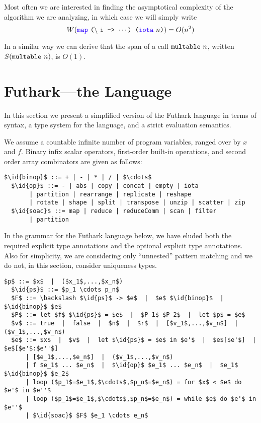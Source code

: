 \documentclass[oneside,11pt]{book}
\begin{document}
\noindent
Most often we are interested in finding the asymptotical complexity of
the algorithm we are analyzing, in which case we will simply write
$$W(\fop{map}~\kw{(}\backslash~\kw{i -> $\cdots$) (}\fop{iota}~\kw{$n$)}) = O(n^2) $$

In a similar way we can derive that the span of a call
$\texttt{multable}~n$, written $S(\texttt{multable}~n)$, is $O(1)$.


\section{Futhark---the Language}

In this section we present a simplified version of the Futhark
language in terms of syntax, a type system for the language, and a
strict evaluation semantics.

We assume a countable infinite number of program variables, ranged over
by $x$ and $f$. Binary infix scalar operators, first-order built-in operations, and
second order array combinators are given as follows:

\begin{lstlisting}[mathescape=true]
  $\id{binop}$ ::= + | - | * | / | $\cdots$
  $\id{op}$ ::= - | abs | copy | concat | empty | iota
       | partition | rearrange | replicate | reshape
       | rotate | shape | split | transpose | unzip | scatter | zip
  $\id{soac}$ ::= map | reduce | reduceComm | scan | filter
       | partition
\end{lstlisting}

In the grammar for the Futhark language below, we have eluded both the
required explicit type annotations and the optional explicit type
annotations. Also for simplicity, we are considering only ``unnested''
pattern matching and we do not, in this section, consider uniqueness types.

\begin{lstlisting}[mathescape=true]
  $p$ ::= $x$  |  ($x_1$,...,$x_n$)
  $\id{ps}$ ::= $p_1 \cdots p_n$
  $F$ ::= \backslash $\id{ps}$ -> $e$  |  $e$ $\id{binop}$  |  $\id{binop}$ $e$
  $P$ ::= let $f$ $\id{ps}$ = $e$  |  $P_1$ $P_2$  |  let $p$ = $e$
  $v$ ::= true  |  false  |  $n$  |  $r$  |  [$v_1$,...,$v_n$]  |  ($v_1$,...,$v_n$)
  $e$ ::= $x$  |  $v$  |  let $\id{ps}$ = $e$ in $e'$  |  $e$[$e'$]  |  $e$[$e'$:$e''$]
      | [$e_1$,...,$e_n$]  |  ($v_1$,...,$v_n$)
      | f $e_1$ ... $e_n$  |  $\id{op}$ $e_1$ ... $e_n$  |  $e_1$ $\id{binop}$ $e_2$
      | loop ($p_1$=$e_1$,$\cdots$,$p_n$=$e_n$) = for $x$ < $e$ do $e'$ in $e''$
      | loop ($p_1$=$e_1$,$\cdots$,$p_n$=$e_n$) = while $e$ do $e'$ in $e''$
      | $\id{soac}$ $F$ $e_1 \cdots e_n$
\end{lstlisting}
\end{document}
